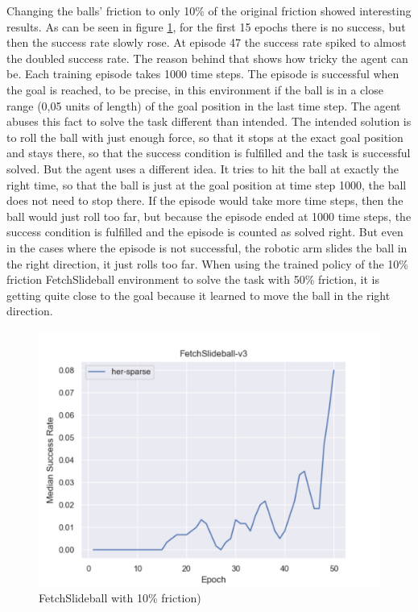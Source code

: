 Changing the balls' friction to only 10\% of the original friction showed interesting results. As can be seen in figure \ref{slideball4}, for the first 15 epochs there is no success, but then the success rate slowly rose. At episode 47 the success rate spiked to almost the doubled success rate. The reason behind that shows how tricky the agent can be. Each training episode takes 1000 time steps. The episode is successful when the goal is reached, to be precise, in this environment if the ball is in a close range (0,05 units of length) of the goal position in the last time step.
The agent abuses this fact to solve the task different than intended. The intended solution is to roll the ball with just enough force, so that it stops at the exact goal position and stays there, so that the success condition is fulfilled and the task is successful solved. But the agent uses a different idea. It tries to hit the ball at exactly the right time, so that the ball is just at the goal position at time step 1000, the ball does not need to stop there. If the episode would take more time steps, then the ball would just roll too far, but because the episode ended at 1000 time steps, the success condition is fulfilled and the episode is counted as solved right.
But even in the cases where the episode is not successful, the robotic arm slides the ball in the right direction, it just rolls too far. When using the trained policy of the 10\% friction FetchSlideball environment to solve the task with 50\% friction, it is getting quite close to the goal because it learned to move the ball in the right direction.


\begin{figure} [h]
	
	\centering
	\includegraphics[width=1\textwidth]{figures/fig_FetchSlideball-v3.pdf}
	\caption{FetchSlideball with 10\% friction)}
	\label{slideball4}
\end{figure}

